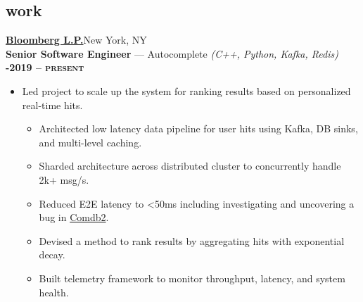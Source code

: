 \documentclass[margin,10pt]{res}
\begin{document}
\begin{resume}
\section{\sc \lsstyle work}
    \href{https://www.bloomberg.com/company/careers/working-here/engineering/}{\textbf{\large  {} Bloomberg L.P.}}\hfill New York, NY\\
    \textbf{Senior Software Engineer} --- Autocomplete
    \textit{(C++, Python, Kafka, Redis)}\hfill
    \textsc{\bfseries{}-2019 -- present}
    \vspace{0.5em}
    \begin{itemize}
        \item Led project to scale up the system for ranking results based on personalized real-time hits.
        \begin{itemize}
            \item Architected low latency data pipeline for user hits using Kafka, DB sinks, and multi-level caching.
            \item Sharded architecture across distributed cluster to concurrently handle 2k+ msg/s.
            \item Reduced E2E latency to <50ms including investigating and uncovering a bug in \href{https://en.wikipedia.org/wiki/Comdb2/}{Comdb2}.
            \item Devised a method to rank results by aggregating hits with exponential decay.
            \item Built telemetry framework to monitor throughput, latency, and system health.

\end{itemize}
\end{itemize}
\end{resume}
\end{document}
